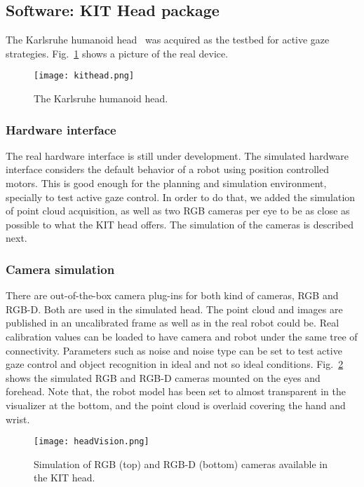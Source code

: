 \subsection{Software: KIT Head package}
\label{sec:kithead}

The Karlsruhe humanoid head~\cite{Asfour2008KITHead} was acquired as the testbed for active gaze strategies. Fig.~\ref{fig:kit_head} shows a picture of the real device.

\begin{figure}
\centering
\texttt{[image: kithead.png]}
\caption{The Karlsruhe humanoid head.}
\label{fig:kit_head}
\end{figure}

\subsubsection{Hardware interface}

The real hardware interface is still under development. The simulated hardware interface considers the default behavior of a robot using position controlled motors. This is good enough for the planning and simulation environment, specially to test active gaze control. In order to do that, we added the simulation of point cloud acquisition, as well as two RGB cameras per eye to be as close as possible to what the KIT head offers. The simulation of the cameras is described next.

\subsubsection{Camera simulation}
There are out-of-the-box camera plug-ins for both kind of cameras, RGB and RGB-D. Both are used in the simulated head. The point cloud and images are published in an uncalibrated frame as well as in the real robot could be. Real calibration values can be loaded to have camera and robot  under the same tree of connectivity. Parameters such as noise and noise type can be set to test active gaze control and object recognition in ideal and not so ideal conditions. Fig.~\ref{fig:kit_vision} shows the simulated RGB and RGB-D cameras mounted on the eyes and forehead. Note that, the robot model has been set to almost transparent in the visualizer at the bottom, and the point cloud is overlaid covering the hand and wrist.

\begin{figure}[h!]
\centering
\texttt{[image: headVision.png]}
\caption{Simulation of RGB (top) and RGB-D (bottom) cameras available in the KIT head.}
\label{fig:kit_vision}
\end{figure}